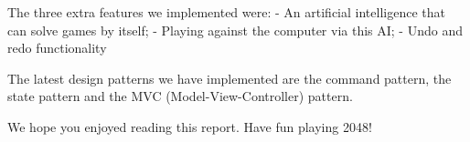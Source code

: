 \documentclass[a4paper,11pt,report]{scrartcl}
\begin{document}
The three extra features we implemented were:
- An artificial intelligence that can solve games by itself;
- Playing against the computer via this AI;
- Undo and redo functionality

The latest design patterns we have implemented are the command pattern, the
state pattern and the MVC (Model-View-Controller) pattern.

We hope you enjoyed reading this report. Have fun playing 2048!
\end{document}

